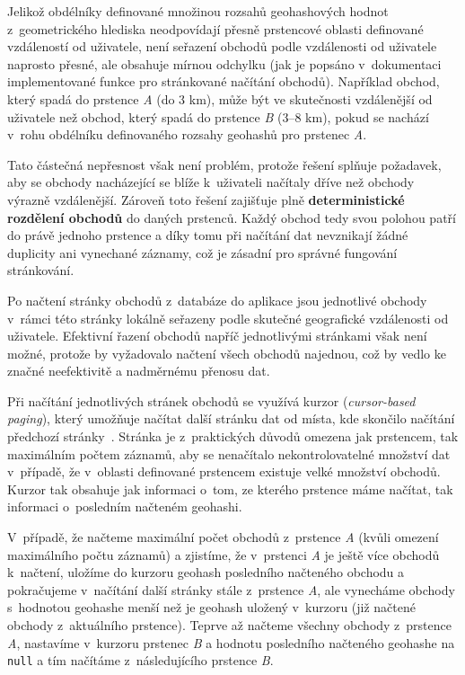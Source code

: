 Jelikož obdélníky definované množinou rozsahů geohashových hodnot z~geometrického hlediska neodpovídají přesně prstencové oblasti definované vzdáleností od uživatele, není seřazení obchodů podle vzdálenosti od uživatele naprosto přesné, ale obsahuje mírnou odchylku (jak je popsáno v~dokumentaci implementované funkce pro stránkované načítání obchodů).
Například obchod, který spadá do prstence \textit{A} (do 3 km), může být ve skutečnosti vzdálenější od uživatele než obchod, který spadá do prstence \textit{B} (3--8 km), pokud se nachází v~rohu obdélníku definovaného rozsahy geohashů pro prstenec \textit{A}.

Tato částečná nepřesnost však není problém, protože řešení splňuje požadavek, aby se obchody nacházející se blíže k~uživateli načítaly dříve než obchody výrazně vzdálenější.
Zároveň toto řešení zajišťuje plně \textbf{deterministické rozdělení obchodů} do daných prstenců.
Každý obchod tedy svou polohou patří do právě jednoho prstence a díky tomu při načítání dat nevznikají žádné duplicity ani vynechané záznamy, což je zásadní pro správné fungování stránkování.

Po načtení stránky obchodů z~databáze do aplikace jsou jednotlivé obchody v~rámci této stránky lokálně seřazeny podle skutečné geografické vzdálenosti od uživatele.
Efektivní řazení obchodů napříč jednotlivými stránkami však není možné, protože by vyžadovalo načtení všech obchodů najednou, což by vedlo ke značné neefektivitě a nadměrnému přenosu dat.

Při načítání jednotlivých stránek obchodů se využívá kurzor (\textit{cursor-based paging}), který umožňuje načítat další stránku dat od místa, kde skončilo načítání předchozí stránky~\parencite{cursor_based_paging}.
Stránka je z~praktických důvodů omezena jak prstencem, tak maximálním počtem záznamů, aby se nenačítalo nekontrolovatelné množství dat v~případě, že v~oblasti definované prstencem existuje velké množství obchodů.
Kurzor tak obsahuje jak informaci o~tom, ze kterého prstence máme načítat, tak informaci o~posledním načteném geohashi.

V~případě, že načteme maximální počet obchodů z~prstence \textit{A} (kvůli omezení maximálního počtu záznamů) a zjistíme, že v~prstenci \textit{A} je ještě více obchodů k~načtení, uložíme do kurzoru geohash posledního načteného obchodu a pokračujeme v~načítání další stránky stále z~prstence \textit{A}, ale vynecháme obchody s~hodnotou geohashe menší než je geohash uložený v~kurzoru (již načtené obchody z~aktuálního prstence).
Teprve až načteme všechny obchody z~prstence \textit{A}, nastavíme v~kurzoru prstenec \textit{B} a hodnotu posledního načteného geohashe na \texttt{null} a tím načítáme z~následujícího prstence \textit{B}.

